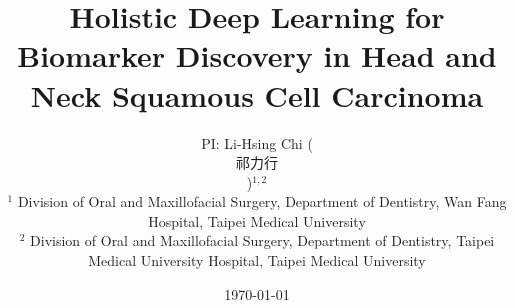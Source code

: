 \documentclass[12pt, a4paper]{article}
\newcommand{\cntext}[1]{\begin{CJK*}{UTF8}{bkai}#1\end{CJK*}}
\begin{document}

\thispagestyle{titlepage}

\clearpage
\title{\Large \vspace{-2.5cm} Holistic Deep Learning for Biomarker Discovery in Head and Neck Squamous Cell Carcinoma}

\author{\small PI: Li-Hsing Chi (\cntext{祁力行})$^{1,2}$\\
{\footnotesize $^{1}$ \quad Division of Oral and Maxillofacial Surgery, Department of Dentistry\unskip, 
Wan Fang Hospital\unskip, Taipei Medical University}\\
    
{\footnotesize $^{2}$ \quad Division of Oral and Maxillofacial Surgery, Department of Dentistry\unskip,
    Taipei Medical University Hospital\unskip, Taipei Medical University}\\
    
    

}
\date{\small \today}


\maketitle

\thispagestyle{titlepage}

%
%
\end{document}
